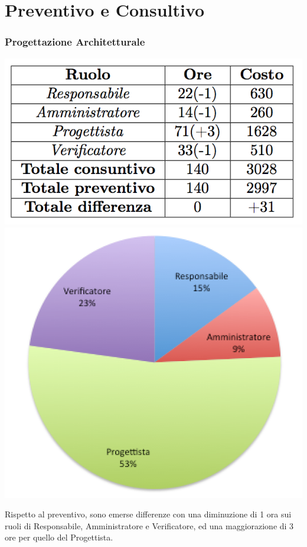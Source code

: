 \section{Preventivo e Consultivo}
\begin{frame}
  \frametitle{Progettazione Architetturale}
  \begin{center}
  	\includegraphics[scale=0.5]{img/prevPA}
  	\includegraphics[scale=0.4]{img/cakePA}
  \end{center}
Rispetto al preventivo, sono emerse differenze con una diminuzione di 1 ora sui ruoli di Responsabile, Amministratore e Verificatore, ed una maggiorazione di 3 ore per quello del Progettista.
\end{frame}

